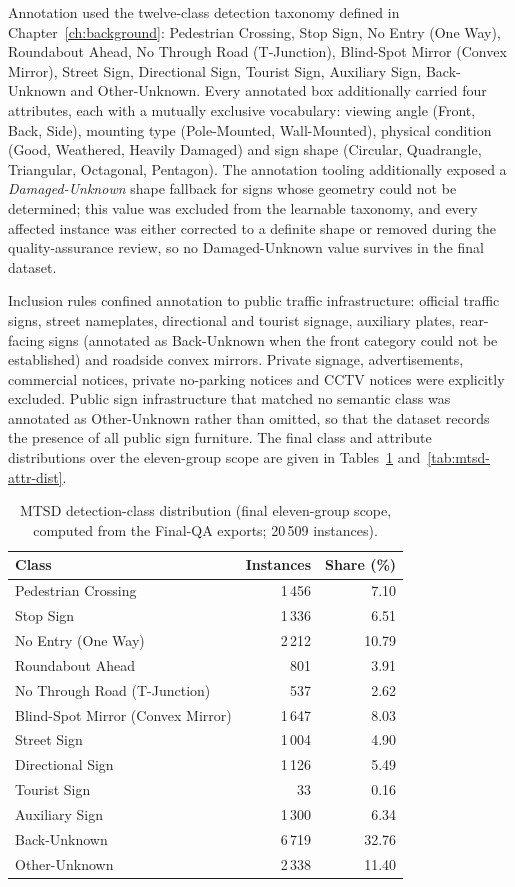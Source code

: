 Annotation used the twelve-class detection taxonomy defined in Chapter~\ref{ch:background}: Pedestrian Crossing, Stop Sign, No Entry (One Way), Roundabout Ahead, No Through Road (T-Junction), Blind-Spot Mirror (Convex Mirror), Street Sign, Directional Sign, Tourist Sign, Auxiliary Sign, Back-Unknown and Other-Unknown. Every annotated box additionally carried four attributes, each with a mutually exclusive vocabulary: viewing angle (Front, Back, Side), mounting type (Pole-Mounted, Wall-Mounted), physical condition (Good, Weathered, Heavily Damaged) and sign shape (Circular, Quadrangle, Triangular, Octagonal, Pentagon). The annotation tooling additionally exposed a \emph{Damaged-Unknown} shape fallback for signs whose geometry could not be determined; this value was excluded from the learnable taxonomy, and every affected instance was either corrected to a definite shape or removed during the quality-assurance review, so no Damaged-Unknown value survives in the final dataset.

Inclusion rules confined annotation to public traffic infrastructure: official traffic signs, street nameplates, directional and tourist signage, auxiliary plates, rear-facing signs (annotated as Back-Unknown when the front category could not be established) and roadside convex mirrors. Private signage, advertisements, commercial notices, private no-parking notices and CCTV notices were explicitly excluded. Public sign infrastructure that matched no semantic class was annotated as Other-Unknown rather than omitted, so that the dataset records the presence of all public sign furniture. The final class and attribute distributions over the eleven-group scope are given in Tables~\ref{tab:mtsd-class-dist} and~\ref{tab:mtsd-attr-dist}.

\begin{table}[htbp]
\centering
\caption{MTSD detection-class distribution (final eleven-group scope, computed from the Final-QA exports; 20\,509 instances).}
\label{tab:mtsd-class-dist}
\small
\begin{tabular}{lrr}
\hline
\textbf{Class} & \textbf{Instances} & \textbf{Share (\%)} \\
\hline
Pedestrian Crossing & 1\,456 & 7.10 \\
Stop Sign & 1\,336 & 6.51 \\
No Entry (One Way) & 2\,212 & 10.79 \\
Roundabout Ahead & 801 & 3.91 \\
No Through Road (T-Junction) & 537 & 2.62 \\
Blind-Spot Mirror (Convex Mirror) & 1\,647 & 8.03 \\
Street Sign & 1\,004 & 4.90 \\
Directional Sign & 1\,126 & 5.49 \\
Tourist Sign & 33 & 0.16 \\
Auxiliary Sign & 1\,300 & 6.34 \\
Back-Unknown & 6\,719 & 32.76 \\
Other-Unknown & 2\,338 & 11.40 \\
\hline
\end{tabular}
\end{table}

